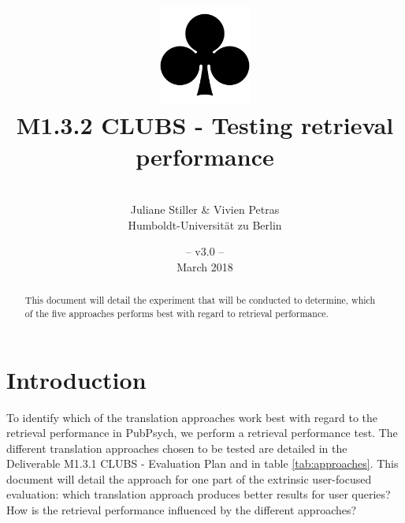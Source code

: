 \documentclass[a4paper,11pt]{article}
\title{
\includegraphics[width=3cm]{./img/200px-SuitClubs.png} \\
\Huge M1.3.2 CLUBS - Testing retrieval performance
  \\ 
}
\author{\vspace*{1cm}\\ \LARGE Juliane Stiller \& Vivien Petras \medskip \\ \Large Humboldt-Universit\"at zu Berlin}
\date{\vspace*{2cm} -- v3.0 --\\March 2018}
\begin{document}
\clearpage\maketitle
\thispagestyle{empty}

\vspace*{5cm}
\begin{abstract}
This document will detail the experiment that will be conducted to determine, which of the five approaches performs best with regard to retrieval performance.
\end{abstract}

\newpage
\tableofcontents
\clearpage


\section{Introduction}
To identify which of the translation approaches work best with regard to the retrieval performance in PubPsych, we perform a retrieval performance test. The different translation approaches chosen to be tested are detailed in the Deliverable M1.3.1 CLUBS - Evaluation Plan and in table \ref{tab:approaches}. This document will detail the approach for one part of the extrinsic user-focused evaluation: which translation approach produces better results for user queries? How is the retrieval performance influenced by the different approaches?
\end{document}

